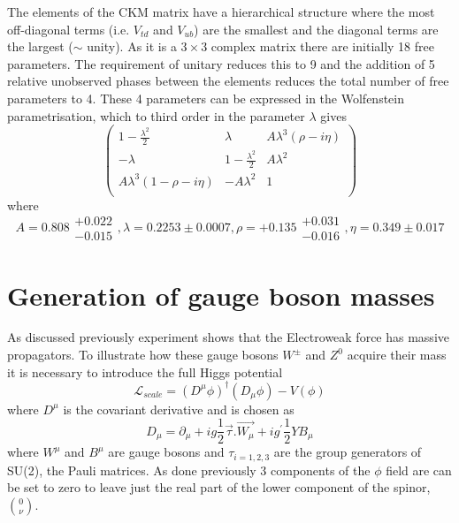 The elements of the CKM matrix have a hierarchical structure where the most off-diagonal terms (i.e. $V_{td}$ and $V_{ub}$) are the smallest and the diagonal terms are the largest ($\sim$ unity). As it is a $3\times3$ complex matrix there are initially 18 free parameters. The requirement of unitary reduces this to 9 and the addition of 5 relative unobserved phases between the elements reduces the total number of free parameters to 4. These 4 parameters can be expressed in the Wolfenstein parametrisation, which to third order in the parameter $\lambda$ gives ~\cite{wolf}
\begin{equation}
  \begin{pmatrix}1 - \frac{\lambda^{2}}{2} &\lambda& A\lambda^{3}(\rho - i\eta)\\-\lambda&1-\frac{\lambda^{2}}{2} & A\lambda^{2}\\ A\lambda^{3}(1-\rho - i\eta)&-A\lambda^{2}&1\\\end{pmatrix}
\end{equation}
where 
\begin{equation}
  A = 0.808\substack{+0.022\\-0.015}, \lambda = 0.2253\pm 0.0007,  \rho =+ 0.135\substack{+0.031\\-0.016},  \eta = 0.349\pm0.017
\end{equation}
\section{Generation of gauge boson masses}
As discussed previously experiment shows that the Electroweak force has massive propagators. To illustrate how these gauge bosons $W^{\pm}$ and $Z^{0}$ acquire their mass it is necessary to introduce the full Higgs potential
\begin{equation}
\mathcal{L}_{scale} = (D^{\mu}\phi)^{\dagger}(D_{\mu}\phi) - V(\phi)
\end{equation}
where $D^{\mu}$ is the covariant derivative and is chosen as %
\begin{equation}
  D_{\mu} = \partial_{\mu}+ig\frac{1}{2}\vec{\tau}.\vec{W_{\mu}} + ig^{'}\frac{1}{2}YB_{\mu}
  \label{eq:higgscodev}
\end{equation}
where $W^{\mu}$ and $B^{\mu}$ are gauge bosons and $\tau_{i = 1,2,3}$ are the group generators of SU(2), the Pauli matrices. As done previously 3 components of the $\phi$ field are can be set to zero to leave just the real part of the lower component of the spinor, $\binom{0}{\nu}$.
